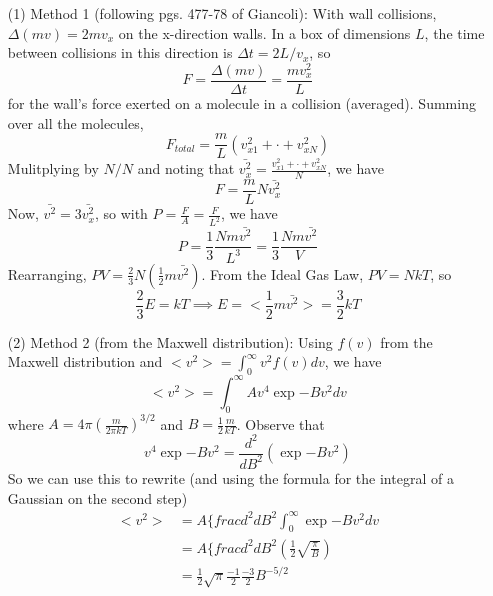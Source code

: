\documentclass{article}
\begin{document}
\begin{itemize}
	\item[(1)] Method 1 (following pgs. 477-78 of Giancoli): With wall collisions, $\Delta (mv) = 2mv_x$ on the x-direction walls. In a box of dimensions $L$, the time between collisions in this direction is $\Delta t = 2L/v_x$, so
	\begin{equation}
	F = \frac{\Delta (mv)}{\Delta t} = \frac{mv_x^2}{L}
	\end{equation}
	for the wall's force exerted on a molecule in a collision (averaged). Summing over all the molecules,
	\begin{equation}
	F_{total} = \frac{m}{L}\left(v_{x1}^2 + \cdot + v_{xN}^2\right)
	\end{equation}
	Mulitplying by $N/N$ and noting that $\bar{v_x^2} = \frac{v_{x1}^2+ \cdot +v_{xN}^2}{N}$, we have
	\begin{equation}
	F = \frac{m}{L}N\bar{v_x^2}
	\end{equation}
	Now, $\bar{v^2}=3\bar{v_x^2}$, so with $P = \frac{F}{A} = \frac{F}{L^2}$, we have
	\begin{equation}
	P = \frac{1}{3}\frac{Nm\bar{v^2}}{L^3} = \frac{1}{3}\frac{Nm\bar{v^2}}{V}
	\end{equation}
	Rearranging, $PV = \frac{2}{3}N\left(\frac{1}{2}m\bar{v^2}\right)$. From the Ideal Gas Law, $PV = NkT$, so
	\begin{equation}
	\frac{2}{3}E = kT \implies E = <\frac{1}{2}m\bar{v^2}> = \frac{3}{2}kT
	\end{equation}
	\item[(2)] Method 2 (from the Maxwell distribution): Using $f(v)$ from the Maxwell distribution and $<v^2> = \int_0^{\infty} v^2f(v)dv$, we have
	\begin{equation}
	<v^2> = \int_0^{\infty} Av^4\exp{-Bv^2} dv
	\end{equation}
	where $A = 4\pi\left(\frac{m}{2\pi kT}\right)^{3/2}$ and $B = \frac{1}{2}\frac{m}{kT}$. Observe that
	\begin{equation}
	v^4\exp{-Bv^2} = \frac{d^2}{dB^2}\left(\exp{-Bv^2}\right)
	\end{equation}
	So we can use this to rewrite (and using the formula for the integral of a Gaussian on the second step)
	\begin{align*}
	<v^2> &= A\{frac{d^2}{dB^2}\int_0^{\infty} \exp{-Bv^2}dv \\
	&= A\{frac{d^2}{dB^2}\left(\frac{1}{2}\sqrt{\frac{\pi}{B}}\right) \\
	&= \frac{1}{2}\sqrt{\pi}\frac{-1}{2}\frac{-3}{2}B^{-5/2} \\

\end{align*}
\end{itemize}
\end{document}
